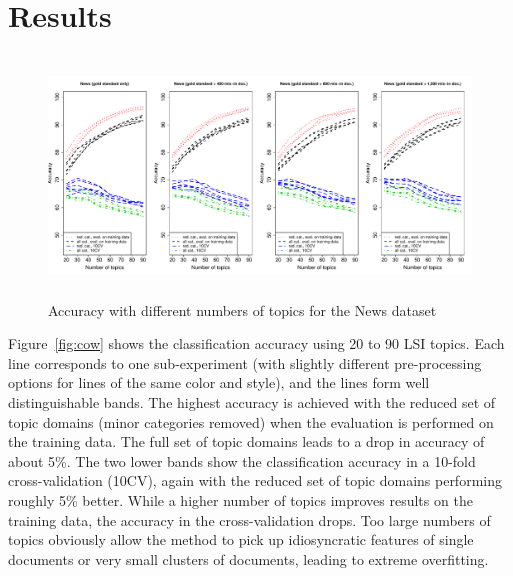 \documentclass[11pt]{article}
\begin{document}
\section{Results}
\label{sec:results}

\begin{figure}[!ht]
  \centering
  \includegraphics[width=\textwidth, height=6.4cm]{graphics/dereko.pdf}
  \caption{Accuracy with different numbers of topics for the News dataset}
  \label{fig:dereko}
\end{figure}

\begin{table}[!ht]
  \centering
  \caption{Evaluation at best achievable accuracy with the reduced set of topic domains in 10-fold cross-validation ($^{\mathrm{\tiny *}}$weighted average across all categories)}
  \label{tab:quality}
\end{table}

Figure~\ref{fig:cow} shows the classification accuracy using 20 to 90 LSI topics.
Each line corresponds to one sub-experiment (with slightly different pre-processing options for lines of the same color and style), and the lines form well distinguishable bands.
The highest accuracy is achieved with the reduced set of topic domains (minor categories removed) when the evaluation is performed on the training data.
The full set of topic domains leads to a drop in accuracy of about 5\%.
The two lower bands show the classification accuracy in a 10-fold cross-validation (10CV), again with the reduced set of topic domains performing roughly 5\% better.
While a higher number of topics improves results on the training data, the accuracy in the cross-validation drops.
Too large numbers of topics obviously allow the method to pick up idiosyncratic features of single documents or very small clusters of documents, leading to extreme overfitting.
\end{document}
